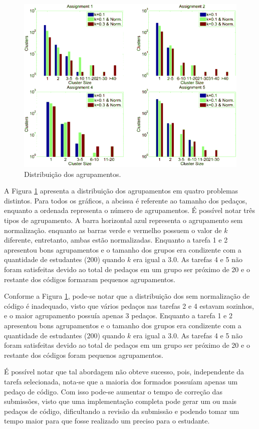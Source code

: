 		\begin{figure}
			\centering
			\includegraphics[width=0.7\linewidth]{imagem/clusteringPerformance}
			\captionsetup{justification=centering}
			\caption{Distribuição dos agrupamentos.}
			\label{fig:clusteringPerformance}
		\end{figure}
	    
		A Figura \ref{fig:clusteringPerformance} apresenta a distribuição dos
		agrupamentos em quatro problemas distintos. Para todos os gráficos, a
		abcissa é referente ao tamanho dos pedaços, enquanto a ordenada representa
		o número de agrupamentos. É possível notar três tipos de agrupamento. A barra
		horizontal azul representa o agrupamento sem normalização. enquanto as barras
		verde e vermelho possuem o valor de $k$ diferente, entretanto, ambas estão
		normalizadas. Enquanto a tarefa 1 e 2 apresentou bons agrupamentos e o tamanho
		dos grupos era condizente com a quantidade de estudantes (200) quando $k$ era
		igual a 3.0. As tarefas 4 e 5 não foram satisfeitas devido ao total de pedaços
		em um grupo ser próximo de 20 e o restante dos códigos formaram pequenos
		agrupamentos.
		
		Conforme a Figura \ref{fig:clusteringPerformance}, pode-se notar que a
		distribuição dos  sem normalização de código é inadequado,
		visto que vários pedaços nas tarefas 2 e 4 estavam sozinhos, e o maior
		agrupamento possuía apenas 3 pedaços. Enquanto a tarefa 1 e 2 apresentou
		bons agrupamentos e o tamanho dos grupos era condizente com a quantidade de
		estudantes (200) quando $k$ era igual a 3.0. As tarefas 4 e 5 não foram
		satisfeitas devido ao total de pedaços em um grupo ser próximo de 20 e o
		restante dos códigos foram pequenos agrupamentos.
		
		É possível notar que tal abordagem não obteve sucesso, pois, independente da
		tarefa selecionada, nota-se que a maioria dos  formados
		possuíam apenas um pedaço de código. Com isso pode-se aumentar o tempo de
		correção das submissões, visto que uma implementação completa pode gerar um
		ou mais pedaços de código, dificultando a revisão da submissão e podendo tomar
		um tempo maior para que fosse realizado um  preciso para o
		estudante.